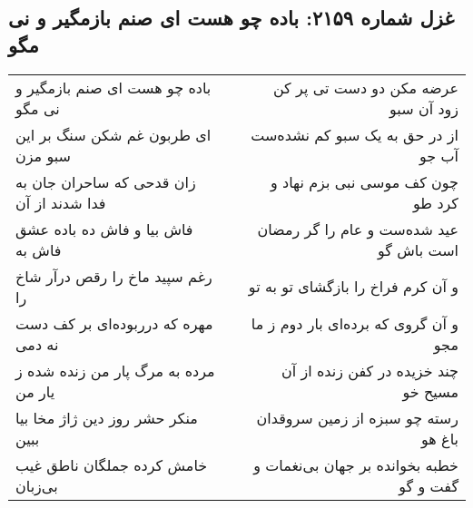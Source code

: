 \begin{center}
\section*{غزل شماره ۲۱۵۹: باده چو هست ای صنم بازمگیر و نی مگو}
\label{sec:2159}
\begin{longtable}{l p{0.5cm} r}
باده چو هست ای صنم بازمگیر و نی مگو
&&
عرضه مکن دو دست تی پر کن زود آن سبو
\\
ای طربون غم شکن سنگ بر این سبو مزن
&&
از در حق به یک سبو کم نشده‌ست آب جو
\\
زان قدحی که ساحران جان به فدا شدند از آن
&&
چون کف موسی نبی بزم نهاد و کرد طو
\\
فاش بیا و فاش ده باده عشق فاش به
&&
عید شده‌ست و عام را گر رمضان است باش گو
\\
رغم سپید ماخ را رقص درآر شاخ را
&&
و آن کرم فراخ را بازگشای تو به تو
\\
مهره که درربوده‌ای بر کف دست نه دمی
&&
و آن گروی که برده‌ای بار دوم ز ما مجو
\\
مرده به مرگ پار من زنده شده ز یار من
&&
چند خزیده در کفن زنده از آن مسیح خو
\\
منکر حشر روز دین ژاژ مخا بیا ببین
&&
رسته چو سبزه از زمین سروقدان باغ هو
\\
خامش کرده جملگان ناطق غیب بی‌زبان
&&
خطبه بخوانده بر جهان بی‌نغمات و گفت و گو
\\
\end{longtable}
\end{center}
